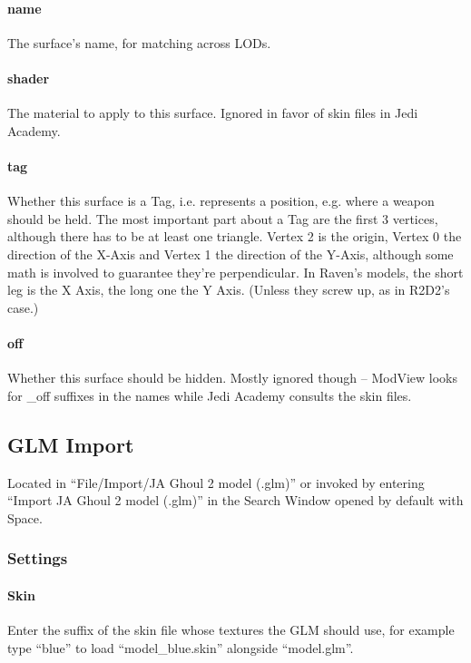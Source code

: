 \documentclass[a4paper,10pt]{article}
\begin{document}
 \paragraph*{name}
 The surface's name, for matching across LODs.
 
 \paragraph*{shader}
 The material to apply to this surface. Ignored in favor of skin files in Jedi Academy.
 
 \paragraph*{tag}
 Whether this surface is a Tag, i.e. represents a position, e.g. where a weapon should be held. The most
 important part about a Tag are the first 3 vertices, although there has to be at least one triangle. Vertex 2
 is the origin, Vertex 0 the direction of the X-Axis and Vertex 1 the direction of the Y-Axis, although some
 math is involved to guarantee they're perpendicular. In Raven's models, the short leg is the X Axis, the
 long one the Y Axis. (Unless they screw up, as in R2D2's case.)
 
 \paragraph*{off}
 Whether this surface should be hidden. Mostly ignored though -- ModView looks for \_off suffixes in the names
 while Jedi Academy consults the skin files.
 
 
 \subsection{GLM Import}
 
 Located in ``File/Import/JA Ghoul 2 model (.glm)'' or invoked by entering ``Import JA Ghoul 2 model (.glm)''
 in the Search Window opened by default with Space.
 
 \subsubsection*{Settings}
 
\paragraph*{Skin}
Enter the suffix of the skin file whose textures the GLM should use, for example type ``blue'' to load
``model\_blue.skin'' alongside ``model.glm''.
\end{document}
